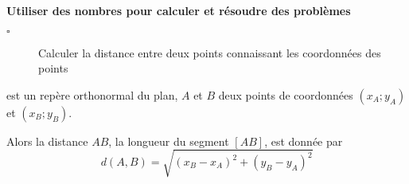\begin{titre}

\end{titre}

\begin{CpsCol}
\textbf{Utiliser des nombres pour calculer et résoudre des problèmes}
\begin{description}
\item[$\square$] Calculer la distance entre deux points connaissant les coordonnées des points
\end{description}
\end{CpsCol}



\begin{Th}
\Oij est un repère orthonormal du plan, $A$ et $B$ deux points de coordonnées $(x_A;y_A)$ et  $(x_B;y_B)$. 

Alors la distance $AB$, la longueur du segment $[AB]$, est donnée par  $$d(A,B)=\sqrt{(x_B-x_A)^2+(y_B-y_A)^2}$$
\end{Th}

\newpage
{} 